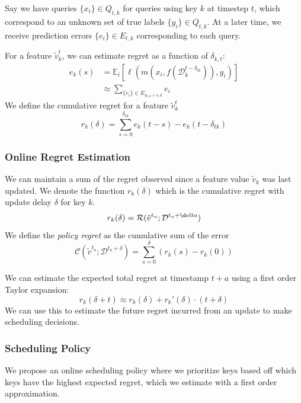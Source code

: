 Say we have queries $\{x_i\} \in Q_{t,k}$ for queries using key $k$ at timestep $t$, which correspond to an unknown set of true labels $\{y_i\} \in Q_{t,k}$.  At a later time, we receive prediction errors $\{e_i\} \in E_{t,k}$ corresponding to each query.  

For a feature $\tilde{v}_k^t$, we can estimate regret as a function of $\delta_{k,t}$:
\begin{align}
    e_k(s) &= \mathbb{E}_i\left[\ell\left(m(x_i, f(\mathcal{D}_k^{t-\delta_{tk}})), y_i\right)\right] \\
    &\approx \sum_{\{e_i\} \in E_{u_{t,k} + s,k}} e_i
\end{align}
We define the cumulative regret for a feature $\tilde{v}_k^t$
\begin{equation}
    r_k(\delta) = \sum_{s=0}^{\delta_{tk}} e_k(t-s) - e_k(t-{\delta_{tk}})
\end{equation}


\subsubsection{Online Regret Estimation}
We can maintain a sum of the regret observed since a feature value $\tilde{v}_k$ was last updated. We denote the function $r_k(\delta)$ which is the cumulative regret with update delay $\delta$ for key $k$. 
\begin{equation}
   r_k(\delta) = \mathcal{R}(\tilde{v}^{t_u}; \mathcal{D}^{t_u+\d elta})
\end{equation}
We define the \textit{policy regret} as the cumulative sum of the error 
\begin{equation}
    \mathcal{C}(\tilde{v}^{t_u}; \mathcal{D}^{t_u+\delta}) = \sum_{s=0}^\delta (r_k(s) - r_k(0))
\end{equation}

We can estimate the expected total regret at timestamp $t+a$ using a first order Taylor expansion: 
\begin{equation}
    r_k(\delta + t) \approx  r_k(
    \delta) +r_k'(\delta)\cdot(t+\delta)
\end{equation}
We can use this to estimate the future regret incurred from an update to make scheduling decisions. 

\subsubsection{Scheduling Policy}
We propose an online scheduling policy where we prioritize keys based off which keys have the highest expected regret, which we estimate with a first order approximation. 

